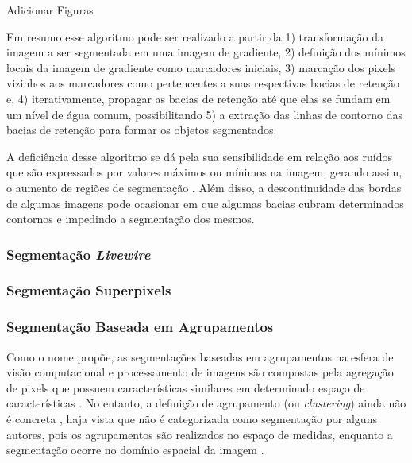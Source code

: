 Adicionar Figuras

Em resumo esse algoritmo pode ser realizado a partir da 1) transformação da imagem a ser segmentada em uma imagem de gradiente, 2) definição dos mínimos locais da imagem de gradiente como marcadores iniciais, 3) marcação dos pixels vizinhos aos marcadores como pertencentes a suas respectivas bacias de retenção e, 4) iterativamente, propagar as bacias de retenção até que elas se fundam em um nível de água comum, possibilitando 5) a extração das linhas de contorno das bacias de retenção para formar os objetos segmentados.

A deficiência desse algoritmo se dá pela sua sensibilidade em relação aos ruídos que são expressados por valores máximos ou mínimos na imagem, gerando assim, o aumento de regiões de segmentação \citep{pedrini2008analise}. Além disso, a descontinuidade das bordas de algumas imagens pode ocasionar em que algumas bacias cubram determinados contornos e impedindo a segmentação dos mesmos.

\subsubsection{Segmentação \textit{Livewire}}
\label{segment:livewire}

\subsubsection{Segmentação Superpixels}
\label{segment:superpixel}

\subsubsection{Segmentação Baseada em Agrupamentos}
\label{segment:group}

Como o nome propõe, as segmentações baseadas em agrupamentos na esfera de visão computacional e processamento de imagens são compostas pela agregação de pixels que possuem características similares em determinado espaço de características \cite{Yuheng2017}. No entanto, a definição de agrupamento (ou \textit{clustering}) ainda não é concreta \cite{Yuheng2017}, haja vista que não é categorizada como segmentação por alguns autores, pois os agrupamentos são realizados no espaço de medidas, enquanto a segmentação ocorre no domínio espacial da imagem \cite{Haralick1985}.

